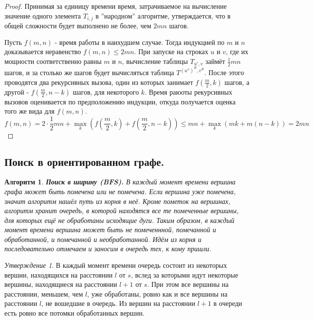 \documentclass[a4paper]{article}
\theoremstyle{indented}
\newtheorem{alg}{Алгоритм}
\theoremstyle{definition}
\theoremstyle{remark}
\newtheorem{stat}{Утверждение}
\begin{document}
\begin{proof}
    Принимая за единицу времени время, затрачиваемое на вычисление значение одного элемента $T_{i, j}$ в ''народном'' алгоритме, утверждается, что в общей сложности будет выполнено не более, чем $2mn$ шагов. \ 

    Пусть $f(m, n)$ - время работы в наихудшем случае. Тогда индукцией по $m$ и $n$ доказывается неравенство $f(m, n)\leq 2mn$. При запуске на строках $u$ и $v$, где их мощности соответственно равны $m$ и $n$, вычисление таблицы $T_{u', v}$ займёт $\frac12 mn$ шагов, и за столько же шагов будет вычисляться таблица $T^{(u'')^R, v^R}$. После этого проводятся два рекурсивных вызова, один из которых занимает $f(\frac{m}{2}, k)$ шагов, а другой - $f(\frac{m}{2}, n-k)$ шагов, для некоторого $k$. Время раюоты рекурсивных вызовов оценивается по предположению индукции, откуда получается оценка того же вида для $f(m,n)$. 
    \[
        f(m, n)=2\cdot \frac12 mn+\max_k (f(\frac{m}{2}, k)+f(\frac{m}{2}, n-k))\leq mn+\max_k(mk+m(n-k))=2mn
    \]
\end{proof}

\subsection{Поиск в ориентированном графе.}

\begin{alg}
    \textbf{Поиск в ширину (BFS).} В каждый момент времени вершина графа может быть помечена или не помечена. Если вершина уже помечена, значит алгоритм нашёл путь из корня в неё. Кроме пометок на вершинах, алгоритм хранит очередь, в которой находятся все те помеченные вершины, для которых ещё не обработаны исходящие дуги. Таким образом, в каждый момент времени вершина может быть не помеченнной, помечанной и обработанной, и помечанной и необработанной. Идём из корня и последовательно отмечаем и заносим в очередь тех, к кому пришли.
\end{alg}

\begin{stat}
    В каждый момент времени очередь состоит из некоторых вершин, находящихся на расстоянии $l$ от $s$, вслед за которыми идут некоторые вершины, находящиеся на расстоянии $l+1$ от $s$. При этом все вершины на расстоянии, меньшем, чем $l$, уже обработаны, ровно как и все вершины на расстоянии $l$, не вошедшие в очередь. Из вершин на расстоянии $l+1$ в очереди есть ровно все потомки обработанных вершин.
\end{stat}
\end{document}
